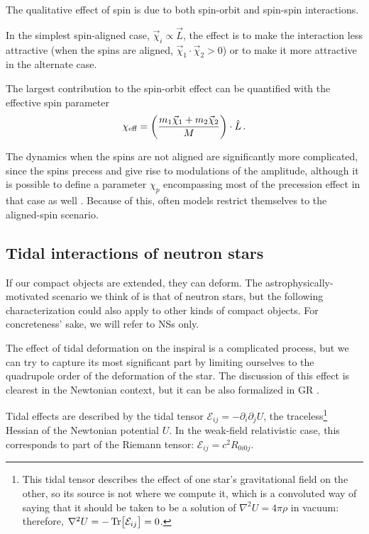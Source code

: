 \documentclass[main.tex]{subfiles}
\begin{document}
The qualitative effect of spin is due to both spin-orbit and spin-spin interactions. 

In the simplest spin-aligned case, \(\vec{\chi}_i \propto \vec{L} \), the effect is to make the interaction less attractive (when the spins are aligned, \(\vec{\chi}_1 \cdot \vec{\chi}_2 > 0\)) or to make it more attractive in the alternate case. 

The largest contribution to the spin-orbit effect can be quantified with the effective spin parameter \cite[]{ligoscientificandvirgocollaborationGW170104Observation50SolarMass2017}
%
\begin{align}
\chi _{\text{eff}} = \qty(\frac{m_1 \vec{\chi}_1 + m_2 \vec{\chi}_2 }{M}) \cdot \hat{L}
\,.
\end{align}

The dynamics when the spins are not aligned are significantly more complicated, since the spins precess and give rise to modulations of the amplitude, although it is possible to define a parameter \(\chi _p\) encompassing most of the precession effect in that case as well \cite[]{schmidtModelsGravitationalWaveforms2015}. 
Because of this, often models restrict themselves to the aligned-spin scenario. 

\subsection{Tidal interactions of neutron stars}

If our compact objects are extended, they can deform. The astrophysically-motivated scenario we think of is that of neutron stars, but the following characterization could also apply to other kinds of compact objects. For concreteness' sake, we will refer to \acsp{NS} only.

The effect of tidal deformation on the inspiral is a complicated process, but we can try to capture its most significant part by limiting ourselves to the quadrupole order of the deformation of the star. 
The discussion of this effect is clearest in the Newtonian context, but it can be also formalized in \ac{GR} \cite[section 14.4.1]{maggioreGravitationalWavesVolume2018}.

Tidal effects are described by the tidal tensor \(\mathcal{E}_{ij} = - \partial_{i} \partial_{j} U\), the traceless\footnote{This tidal tensor describes the effect of one star's gravitational field on the other, so its source is not where we compute it, which is a convoluted way of saying that it should be taken to be a solution of \(\nabla^2 U = 4 \pi \rho \) in vacuum: therefore, \(\nabla^2 U = - \Tr[\mathcal{E}_{ij}] = 0\).} Hessian of the Newtonian potential \(U\). In the weak-field relativistic case, this corresponds to part of the Riemann tensor: \(\mathcal{E}_{ij} = c^2R_{0i0j}\). 
\end{document}
